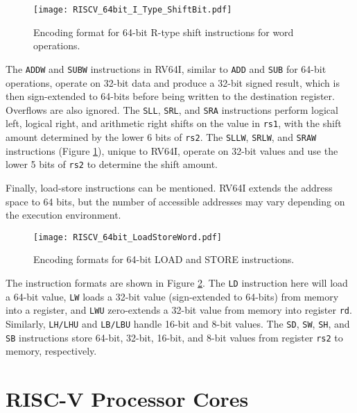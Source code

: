 \begin{figure}[h!]
    \centering
    \texttt{[image: RISCV\_64bit\_I\_Type\_ShiftBit.pdf]}
    \caption{Encoding format for 64-bit R-type shift instructions for word operations. \cite{riscv:manual:user:2024}}
    \label{fig:rv64i_shift_r_format}
\end{figure}

The \texttt{ADDW} and \texttt{SUBW} instructions in RV64I, similar to \texttt{ADD} and \texttt{SUB} for 64-bit operations, operate on 32-bit data and produce a 32-bit signed result, which is then sign-extended to 64-bits before being written to the destination register. Overflows are also ignored. The \texttt{SLL}, \texttt{SRL}, and \texttt{SRA} instructions perform logical left, logical right, and arithmetic right shifts on the value in \texttt{rs1}, with the shift amount determined by the lower 6 bits of \texttt{rs2}. The \texttt{SLLW}, \texttt{SRLW}, and \texttt{SRAW} instructions (Figure \ref{fig:rv64i_shift_r_format}), unique to RV64I, operate on 32-bit values and use the lower 5 bits of \texttt{rs2} to determine the shift amount.

Finally, load-store instructions can be mentioned. RV64I extends the address space to 64 bits, but the number of accessible addresses may vary depending on the execution environment.

\begin{figure}[h!]
    \centering
    \texttt{[image: RISCV\_64bit\_LoadStoreWord.pdf]}
    \caption{Encoding formats for 64-bit LOAD and STORE instructions. \cite{riscv:manual:user:2024}}
    \label{fig:rv64i_load_store_format}
\end{figure}

The instruction formats are shown in Figure \ref{fig:rv64i_load_store_format}. The \texttt{LD} instruction here will load a 64-bit value, \texttt{LW} loads a 32-bit value (sign-extended to 64-bits) from memory into a register, and \texttt{LWU} zero-extends a 32-bit value from memory into register \texttt{rd}. Similarly, \texttt{LH/LHU} and \texttt{LB/LBU} handle 16-bit and 8-bit values. The \texttt{SD}, \texttt{SW}, \texttt{SH}, and \texttt{SB} instructions store 64-bit, 32-bit, 16-bit, and 8-bit values from register \texttt{rs2} to memory, respectively.

\section{RISC-V Processor Cores}

